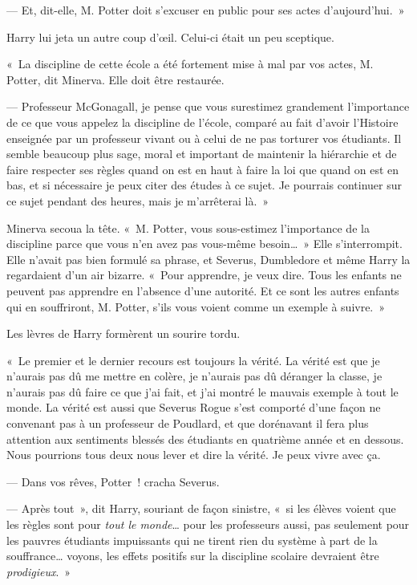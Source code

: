 --- Et, dit-elle, M. Potter doit s'excuser en public pour ses actes d'aujourd'hui.~»

Harry lui jeta un autre coup d'œil. Celui-ci était un peu sceptique.

«~La discipline de cette école a été fortement mise à mal par vos actes, M. Potter, dit Minerva. Elle doit être restaurée.

--- Professeur McGonagall, je pense que vous surestimez grandement l'importance de ce que vous appelez la discipline de l'école, comparé au fait d'avoir l'Histoire enseignée par un professeur vivant ou à celui de ne pas torturer vos étudiants. Il semble beaucoup plus sage, moral et important de maintenir la hiérarchie et de faire respecter ses règles quand on est en haut à faire la loi que quand on est en bas, et si nécessaire je peux citer des études à ce sujet. Je pourrais continuer sur ce sujet pendant des heures, mais je m'arrêterai là.~»

Minerva secoua la tête. «~M. Potter, vous sous-estimez l'importance de la discipline parce que vous n'en avez pas vous-même besoin…~» Elle s'interrompit. Elle n'avait pas bien formulé sa phrase, et Severus, Dumbledore et même Harry la regardaient d'un air bizarre. «~Pour apprendre, je veux dire. Tous les enfants ne peuvent pas apprendre en l'absence d'une autorité. Et ce sont les autres enfants qui en souffriront, M. Potter, s'ils vous voient comme un exemple à suivre.~»

Les lèvres de Harry formèrent un sourire tordu.

«~Le premier et le dernier recours est toujours la vérité. La vérité est que je n'aurais pas dû me mettre en colère, je n'aurais pas dû déranger la classe, je n'aurais pas dû faire ce que j'ai fait, et j'ai montré le mauvais exemple à tout le monde. La vérité est aussi que Severus Rogue s'est comporté d'une façon ne convenant pas à un professeur de Poudlard, et que dorénavant il fera plus attention aux sentiments blessés des étudiants en quatrième année et en dessous. Nous pourrions tous deux nous lever et dire la vérité. Je peux vivre avec ça.

--- Dans vos rêves, Potter~! cracha Severus.

--- Après tout~», dit Harry, souriant de façon sinistre, «~si les élèves voient que les règles sont pour \emph{tout le monde}… pour les professeurs aussi, pas seulement pour les pauvres étudiants impuissants qui ne tirent rien du système à part de la souffrance… voyons, les effets positifs sur la discipline scolaire devraient être \emph{prodigieux}.~»

